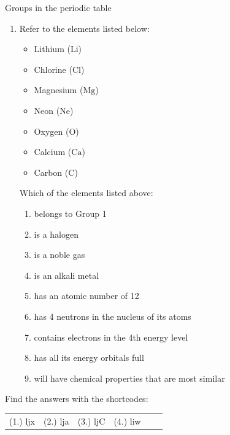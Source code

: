 \begin{exercises}{Groups in the periodic table}
\begin{enumerate}[noitemsep, label=\textbf{\arabic*}. ]
\item            \label{m38760*id262476}Refer to the elements listed below: \label{m38760*id7632}\begin{itemize}[noitemsep]
            \item Lithium ($\mathrm{Li}$)\item Chlorine ($\mathrm{Cl}$)\item Magnesium ($\mathrm{Mg}$)\item Neon ($\mathrm{Ne}$)\item Oxygen ($\mathrm{O}$)\item Calcium ($\mathrm{Ca}$)\item Carbon ($\mathrm{C}$)\end{itemize}
         Which of the elements listed above:
        \label{m38760*id262499}\begin{enumerate}[noitemsep, label=\textbf{\alph*}. ] 
            \label{m38760*uid158}\item belongs to Group 1
\label{m38760*uid159}\item is a halogen
\label{m38760*uid160}\item is a noble gas
\label{m38760*uid161}\item is an alkali metal
\label{m38760*uid162}\item has an atomic number of 12
\label{m38760*uid163}\item has 4 neutrons in the nucleus of its atoms
\label{m38760*uid164}\item contains electrons in the 4th energy level
\label{m38760*uid166}\item has all its energy orbitals full
\label{m38760*uid167}\item will have chemical properties that are most similar
\end{enumerate}
\end{enumerate}
         \par 
\label{m38760**end}
\par {} Find the answers with the shortcodes:
 \par \begin{tabular}[h]{cccccc}
 (1.) ljx  & (2.) lja & (3.) ljC & (4.) liw \end{tabular}

\end{exercises}
        \par 
